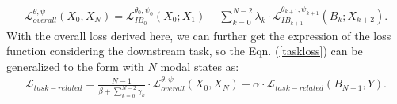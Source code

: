 \begin{align}
\mathcal{L} _{overall}^{\theta ,\psi } \left ( X_{0}, X_{N}  \right )  = \mathcal{L}_{IB_{0}}^{\theta _{0},\psi _{0} } \left ( X_{0}; X_{1} \right ) + \sum_{k=0}^{N-2} \lambda_{k} \cdot \mathcal{L}_{IB_{k+1}}^{\theta _{k+1},\psi _{k+1} } \left ( B_{k}; X_{k+2} \right ).
\label{C1_totalloss}
\end{align}
With the overall loss derived here, we can further get the expression of the loss function considering the downstream task, so the Eqn. (\ref{taskloss}) can be generalized to the form with $N$ modal states as:
\begin{align}
\mathcal{L} _{task-related} = \frac{N-1}{\beta +\sum_{k=0}^{N-2} \gamma_{k}  } \cdot \mathcal{L} _{overall}^{\theta ,\psi } \left ( X_{0}, X_{N}  \right ) + \alpha \cdot \mathcal{L} _{task-related}\left ( B_{N-1}, Y  \right ).
\label{C1_taskloss}
\end{align}